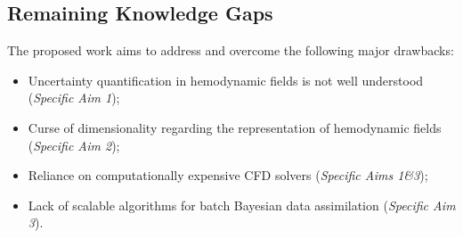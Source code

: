 


\subsection{Remaining Knowledge Gaps}
The proposed work aims to address and overcome the following major drawbacks:
\begin{itemize}[nosep,leftmargin=*]
\item Uncertainty quantification in hemodynamic fields is not well understood (\emph{Specific Aim 1});
\item Curse of dimensionality regarding the representation of hemodynamic fields (\emph{Specific Aim 2});
\item Reliance on computationally expensive CFD solvers (\emph{Specific Aims 1\&3});
\item Lack of scalable algorithms for batch Bayesian data assimilation (\emph{Specific Aim 3}).
\end{itemize}

